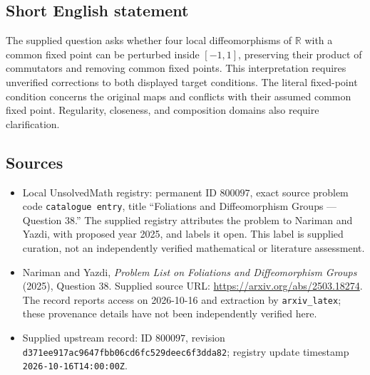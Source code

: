 \documentclass[11pt]{article}
\newcommand{\R}{\mathbb{R}}
\begin{document}
\subsection{Short English statement}
The supplied question asks whether four local diffeomorphisms of \(\R\) with a common fixed point can be perturbed inside \([-1,1]\), preserving their product of commutators and removing common fixed points. This interpretation requires unverified corrections to both displayed target conditions. The literal fixed-point condition concerns the original maps and conflicts with their assumed common fixed point. Regularity, closeness, and composition domains also require clarification.
\subsection{Sources}
\begin{itemize}
\item Local UnsolvedMath registry: permanent ID \(800097\), exact source problem code \texttt{catalogue entry}, title ``Foliations and Diffeomorphism Groups --- Question 38.'' The supplied registry attributes the problem to Nariman and Yazdi, with proposed year 2025, and labels it open. This label is supplied curation, not an independently verified mathematical or literature assessment.
\item Nariman and Yazdi, \emph{Problem List on Foliations and Diffeomorphism Groups} (2025), Question 38. Supplied source URL: \url{https://arxiv.org/abs/2503.18274}. The record reports access on 2026-10-16 and extraction by \texttt{arxiv\_latex}; these provenance details have not been independently verified here.
\item Supplied upstream record: ID \(800097\), revision \texttt{d371ee917ac9647fbb06cd6fc529deec6f3dda82}; registry update timestamp \texttt{2026-10-16T14:00:00Z}.
\end{itemize}
\end{document}
